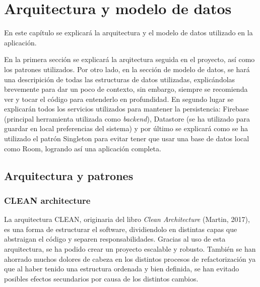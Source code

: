 \chapter{Arquitectura y modelo de datos}
\label{cap:modeloDeDatos}
En este capítulo se explicará la arquitectura y el modelo de datos utilizado en la aplicación. 

En la primera sección se explicará la arqitectura seguida en el proyecto, así como los patrones utilizados. Por otro lado, en la sección de modelo de datos, se hará una descripición de todas las estructuras de datos utilizadas, explicándolas brevemente para dar un poco de contexto, sin embargo, siempre se recomienda ver y tocar el código para entenderlo en profundidad. En segundo lugar se explicarán todos los servicios utilizados para mantener la persistencia: Firebase (principal herramienta utilizada como \textit{backend}), Datastore (se ha utilizado para guardar en local preferencias del sistema) y por último se explicará como se ha utilizado el patrón Singleton para evitar tener que usar una base de datos local como 
Room\hyperlink{cap:biblio}{}, logrando así una aplicación completa.
\section{Arquitectura y patrones}
\subsection{CLEAN architecture}
\label{subsec:cleanArch}
La arquitectura CLEAN, originaria del libro \textit{Clean Architecture} (Martin, 2017)\hyperlink{cap:biblio}{}, es una forma de estructurar el software, dividiendolo en distintas capas que abstraigan el código y separen responsabilidades. Gracias al uso de esta arquitectura, se ha podido crear un proyecto escalable y robusto. También se han ahorrado muchos dolores de cabeza en los distintos procesos de refactorización ya que al haber tenido una estructura ordenada y bien definida, se han evitado posibles efectos secundarios por causa de los distintos cambios.

